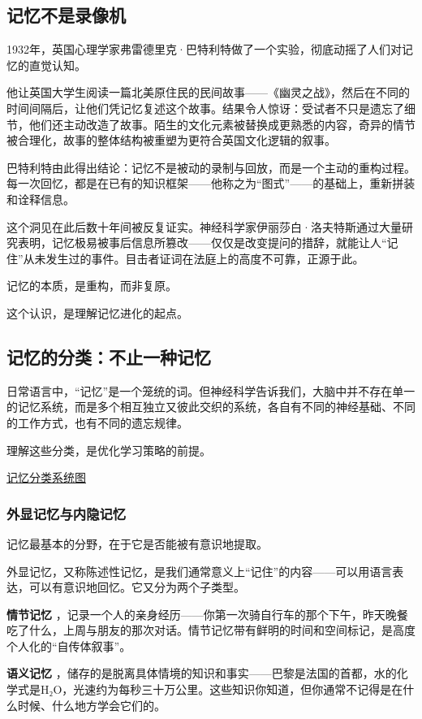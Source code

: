 \documentclass[11pt]{article}
\begin{document}
\subsection{记忆不是录像机}
\label{sec:org053ca14}

1932年，英国心理学家弗雷德里克·巴特利特做了一个实验，彻底动摇了人们对记忆的直觉认知。

他让英国大学生阅读一篇北美原住民的民间故事——《幽灵之战》，然后在不同的时间间隔后，让他们凭记忆复述这个故事。结果令人惊讶：受试者不只是遗忘了细节，他们还主动改造了故事。陌生的文化元素被替换成更熟悉的内容，奇异的情节被合理化，故事的整体结构被重塑为更符合英国文化逻辑的叙事。

巴特利特由此得出结论：记忆不是被动的录制与回放，而是一个主动的重构过程。每一次回忆，都是在已有的知识框架——他称之为“图式”——的基础上，重新拼装和诠释信息。

这个洞见在此后数十年间被反复证实。神经科学家伊丽莎白·洛夫特斯通过大量研究表明，记忆极易被事后信息所篡改——仅仅是改变提问的措辞，就能让人“记住”从未发生过的事件。目击者证词在法庭上的高度不可靠，正源于此。

记忆的本质，是重构，而非复原。

这个认识，是理解记忆进化的起点。
\subsection{记忆的分类：不止一种记忆}
\label{sec:org47af5e9}

日常语言中，“记忆”是一个笼统的词。但神经科学告诉我们，大脑中并不存在单一的记忆系统，而是多个相互独立又彼此交织的系统，各自有不同的神经基础、不同的工作方式，也有不同的遗忘规律。

理解这些分类，是优化学习策略的前提。

\href{file:///c:/Users/fupen/org/book/插图/记忆分类系统图.png}{记忆分类系统图}
\subsubsection{外显记忆与内隐记忆}
\label{sec:org97f7b22}

记忆最基本的分野，在于它是否能被有意识地提取。

外显记忆，又称陈述性记忆，是我们通常意义上“记住”的内容——可以用语言表达，可以有意识地回忆。它又分为两个子类型。

\textbf{情节记忆} ，记录一个人的亲身经历——你第一次骑自行车的那个下午，昨天晚餐吃了什么，上周与朋友的那次对话。情节记忆带有鲜明的时间和空间标记，是高度个人化的“自传体叙事”。

\textbf{语义记忆} ，储存的是脱离具体情境的知识和事实——巴黎是法国的首都，水的化学式是H₂O，光速约为每秒三十万公里。这些知识你知道，但你通常不记得是在什么时候、什么地方学会它们的。
\end{document}
